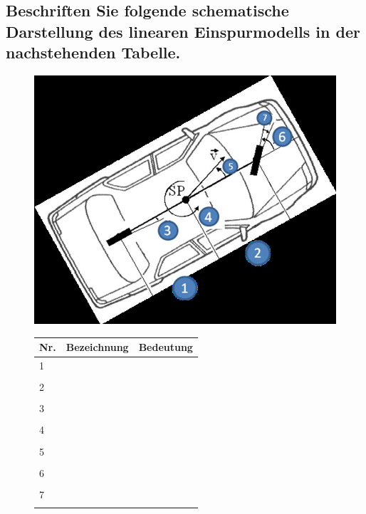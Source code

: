 \subsection{Beschriften Sie folgende schematische Darstellung des linearen Einspurmodells in der nachstehenden Tabelle.}
\begin{figure}[H]
    \centering
    \begin{minipage}[c]{.45\linewidth}
        \centering
        \includegraphics[width=\linewidth]{Graphics/Linearen_Einspurmodell.png}
    \end{minipage}
    \begin{minipage}[c]{.45\linewidth}
        \centering
        \begin{tabular}{|p{.05\linewidth}|p{.2\linewidth}|p{.6\linewidth}|}
            \hline
            Nr. & Bezeichnung & Bedeutung \\
            \hline
            1   &             &           \\
            &&\\
            \hline
            2   &             &           \\
            &&\\
            \hline
            3   &             &           \\
            &&\\
            \hline
            4   &             &           \\
            &&\\
            \hline
            5   &             &           \\
            &&\\
            \hline
            6   &             &           \\
            &&\\
            \hline
            7   &             &           \\
            &&\\
            \hline
        \end{tabular}
    \end{minipage}
\end{figure}
